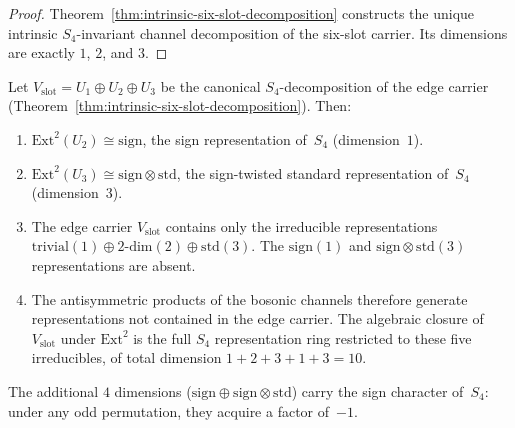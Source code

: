 \begin{proof}
Theorem~\ref{thm:intrinsic-six-slot-decomposition} constructs the unique
intrinsic $S_4$-invariant channel decomposition of the six-slot carrier. Its
dimensions are exactly $1$, $2$, and $3$.
\end{proof}

\begin{theorem}
\label{thm:fermionic-sector-from-ext2}
Let $V_{\mathrm{slot}} = U_1 \oplus U_2 \oplus U_3$ be the canonical
$S_4$-decomposition of the edge carrier
(Theorem~\ref{thm:intrinsic-six-slot-decomposition}). Then:
\begin{enumerate}[label=\textup{(\alph*)}, itemsep=0.3em]
\item $\mathrm{Ext}^2(U_2) \cong \mathrm{sign}$, the sign representation
  of~$S_4$ (dimension~$1$).
\item $\mathrm{Ext}^2(U_3) \cong \mathrm{sign} \otimes \mathrm{std}$, the
  sign-twisted standard representation of~$S_4$ (dimension~$3$).
\item The edge carrier $V_{\mathrm{slot}}$ contains only the irreducible
  representations $\mathrm{trivial}(1) \oplus \mathrm{2\text{-}dim}(2)
  \oplus \mathrm{std}(3)$. The $\mathrm{sign}(1)$ and
  $\mathrm{sign} \otimes \mathrm{std}(3)$ representations are absent.
\item The antisymmetric products of the bosonic channels therefore generate
  representations not contained in the edge carrier. The algebraic closure
  of $V_{\mathrm{slot}}$ under $\mathrm{Ext}^2$ is the full $S_4$
  representation ring restricted to these five irreducibles, of total
  dimension $1 + 2 + 3 + 1 + 3 = 10$.
\end{enumerate}
The additional $4$ dimensions ($\mathrm{sign} \oplus
\mathrm{sign} \otimes \mathrm{std}$) carry the sign character of~$S_4$:
under any odd permutation, they acquire a factor of~$-1$.
\end{theorem}

